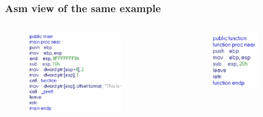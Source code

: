 \documentclass[]{beamer}
\begin{document}
      \begin{frame}
        \frametitle{Asm view of the same example}
        \begin{columns}
            \begin{column}[left]{2.5in}
            \vspace{0.7cm}
                \begin{figure}
                    \includegraphics[width=4cm]{images/ida_main.eps}
                \end{figure}
            \end{column}
            \begin{column}[right]{2.5in}
            \vspace{0.7cm}
                \begin{figure}
                    \includegraphics[width=2cm]{images/ida_function.eps}
                \end{figure}
            \end{column}
        \end{columns}
        \begin{figure}
        \end{figure}
        
     \end{frame}
\end{document}
